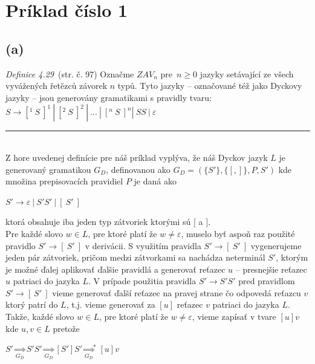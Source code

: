 \documentclass[11pt,a4paper]{article}
\begin{document}
\newpage
\section{Príklad číslo 1} %

\subsection{(a)}\label{sec:a}

\textit{Definice 4.29}~\cite{TIN}(str. č. 97) Označme $ZAV_n$ pre $n \geq 0$ jazyky setávající ze všech vyvážených řetězců závorek $n$ typů. Tyto jazyky -- označované též jako Dyckovy jazyky -- jsou generovány gramatikami s pravidly tvaru: $S \rightarrow [^{1}\ S\ ]^{1} \ |\  [^{2}\ S\ ]^{2} \ |\  ... \ |\  [^{n}\ S\ ]^{n} | \ SS \ | \ \varepsilon $

\rule{17cm}{0.4pt}

\hfill\\[-2em]

Z hore uvedenej definície pre náš príklad vyplýva, že náš Dyckov jazyk $L$ je generovaný gramatikou $G_{D}$, definovanou ako $G_{D} = (\{S'\},\{[,]\},P,S')$ kde množina prepisovacích pravidiel $P$ je daná ako

\begin{center}
$S' \rightarrow \varepsilon \ | \ S'S' \ | \ [\ S' \ ]$
\end{center}

ktorá obsahuje iba jeden typ zátvoriek ktorými sú $[$ a $]$.\\

Pre každé slovo $w \in L$, pre ktoré platí že $w \neq \varepsilon$, muselo byť aspoň raz použité pravidlo $S' \rightarrow [\ S' \ ]$ v derivácii. S využitím pravidla $S' \rightarrow [\ S' \ ]$ vygenerujeme jeden pár zátvoriek, pričom medzi zátvorkami sa nachádza neterminál $S'$, ktorým je možné ďalej aplikovať ďalšie pravidlá a generovať reťazec $u$ -- presnejšie reťazec $u$ patriaci do jazyka $L$. V prípade použitia pravidla $S' \rightarrow S'S'$ pred pravidlom $S' \rightarrow [\ S' \ ]$ vieme generovať ďalší reťazec na pravej strane čo odpovedá reťazcu $v$ ktorý patrí do $L$, t.j. vieme generovať za $[u]$ reťazec $v$ patriaci do jazyka $L$.\\

Takže, každé slovo $w \in L$, pre ktoré platí že $w \neq \varepsilon$, vieme zapísať v tvare $[u]v$ kde $u,v \in L$ pretože

\begin{center}
$S' \underset{G_D}{\Rightarrow} S'S' \underset{G_D}{\Rightarrow} [S']S' {\underset{G_D}{\Rightarrow}}^{*} [u]v$
\end{center}
\end{document}
